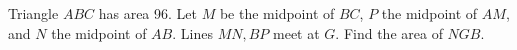 Triangle $ABC$ has area 96. Let $M$ be the midpoint of $BC$, $P$ the midpoint of $AM$, and $N$ the midpoint of $AB$. Lines $MN,BP$ meet at $G$. Find the area of $NGB$.
